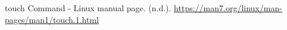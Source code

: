 
\begin{thebibliography}{9}
    touch Command - Linux manual page. (n.d.). \href{https://man7.org/linux/man-pages/man1/touch.1.html}{https://man7.org/linux/man-pages/man1/touch.1.html}
\end{thebibliography}